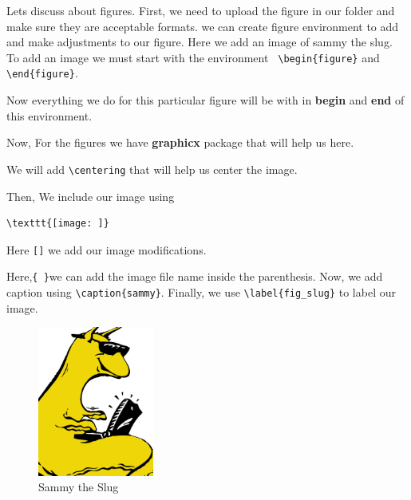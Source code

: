 \documentclass[12pt,journal,compsoc]{IEEEtran}
\begin{document}

Lets discuss about figures.
First, we need to upload the
figure in our folder and make sure they are acceptable formats. 
we can create figure environment to
add and make adjustments to our figure.
Here we add an image of sammy the slug.
To add an image we must start with the 
environment \verb| \begin{figure}| and \verb|\end{figure}|. 

Now everything we do for this particular
figure will be with in \textbf{begin} and \textbf{end}
of this environment.

Now, For the figures we have \textbf{graphicx} package that will help 
us here.

We will add \verb|\centering| that will help us center the image. 

Then, We include our image using\begin{verbatim}\texttt{[image: ]}\end{verbatim}

Here \verb|[]| we add our image mod\-ifications.

Here,\verb|{ }|we can add the image file name inside the parenthesis.
Now, we add caption using \verb|\caption{sammy}|.
Finally, we use \verb|\label{fig_slug}| to label our image.
\begin{figure}[h] 	%
\centering
\includegraphics[width=1.5in]{slug.pdf}
\caption{Sammy the Slug}
\label{fig_slug}
\end{figure}


\end{document}
